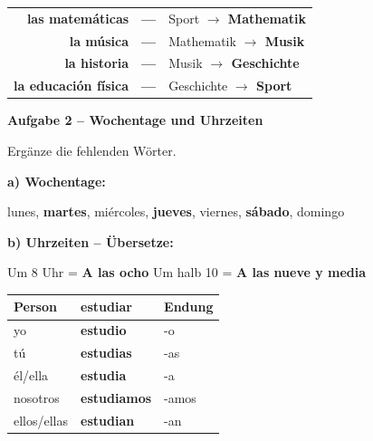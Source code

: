 \documentclass[11pt, a4paper]{article}
\newcommand{\fachfarbe}{spanisch}
\newcommand{\punktebox}[1]{\hfill\fbox{\small \_/#1}}
\newcommand{\lsg}[1]{\textcolor{loesung}{\textbf{#1}}}
\newenvironment{aufgabe}[1]{%
    \needspace{5\baselineskip}%
    \nopagebreak[4]%
    \vspace{10pt}
    \noindent\textbf{\textcolor{\fachfarbe}{Aufgabe #1}}
    \nopagebreak[4]%
    \vspace{5pt}
    \nopagebreak[4]%
    \begin{list}{}{\leftmargin=0pt}
    \item[]
}{%
    \end{list}
}
\newcommand{\es}[1]{\textcolor{\fachfarbe}{\textbf{#1}}}
\begin{document}
\begin{center}
\begin{tabular}{rcl}
\es{las matemáticas} & \lsg{---} & Sport \lsg{$\rightarrow$ Mathematik} \\[0.8em]
\es{la música} & \lsg{---} & Mathematik \lsg{$\rightarrow$ Musik} \\[0.8em]
\es{la historia} & \lsg{---} & Musik \lsg{$\rightarrow$ Geschichte} \\[0.8em]
\es{la educación física} & \lsg{---} & Geschichte \lsg{$\rightarrow$ Sport} \\
\end{tabular}
\end{center}

\vspace{15pt}


\begin{aufgabe}{2 -- Wochentage und Uhrzeiten}
Ergänze die fehlenden Wörter. \punktebox{4}
\end{aufgabe}

\noindent
\textbf{a) Wochentage:}

\vspace{0.5em}

\noindent
lunes, \lsg{martes}, miércoles, \lsg{jueves}, viernes, \lsg{sábado}, domingo

\vspace{1em}

\noindent
\textbf{b) Uhrzeiten -- Übersetze:}

\vspace{0.5em}

\noindent
Um 8 Uhr = \lsg{A las ocho} \hfill Um halb 10 = \lsg{A las nueve y media}

\vspace{15pt}


\begin{merkkasten}

\begin{center}
\begin{tabular}{|l|l|l|}
\hline
\textbf{Person} & \textbf{estudiar} & \textbf{Endung} \\
\hline
yo & \lsg{estudio} & -o \\
\hline
tú & \lsg{estudias} & -as \\
\hline
él/ella & \lsg{estudia} & -a \\
\hline
nosotros & \lsg{estudiamos} & -amos \\
\hline
ellos/ellas & \lsg{estudian} & -an \\
\hline
\end{tabular}
\end{center}

\end{merkkasten}
\end{document}
